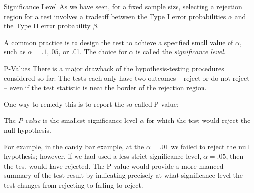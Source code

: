 \documentclass[t,handout]{beamer}
\begin{document}
    \begin{frame}{Significance Level}
        As we have seen, for a fixed sample size, selecting a rejection region for a test involves a tradeoff between the Type I error probabilities $\alpha$ and the Type II error probability $\beta$. 
        
        \vspace{.2cm}
        \pause A common practice is to design the test to achieve a specified small value of $\alpha$, such as $\alpha=.1, .05$, or .01. The choice for $\alpha$ is called the \emph{significance level}.
        \end{frame}

        \begin{frame}{P-Values}
            There is a major drawback of the hypothesis-testing procedures considered so far:
            The tests each only have two outcomes -- reject or do not reject -- even if the test statistic is near the border of the rejection region. 
            
            \vspace{.2cm}
            \pause One way to remedy this is to report the so-called P-value:
            
            \begin{block}{}
            The \emph{P-value} is the smallest significance level $\alpha$ for which the test would reject the null hypothesis.
            \end{block}
            
            \pause For example, in the candy bar example, at the $\alpha=.01$ we failed to reject the null hypothesis; however, if we had used a less strict significance level, $\alpha=.05$, then the test would have rejected. \pause The P-value would provide a more nuanced summary of the test result by indicating precisely at what significance level the test changes from rejecting to failing to reject.
            \end{frame}
            
\end{document}
